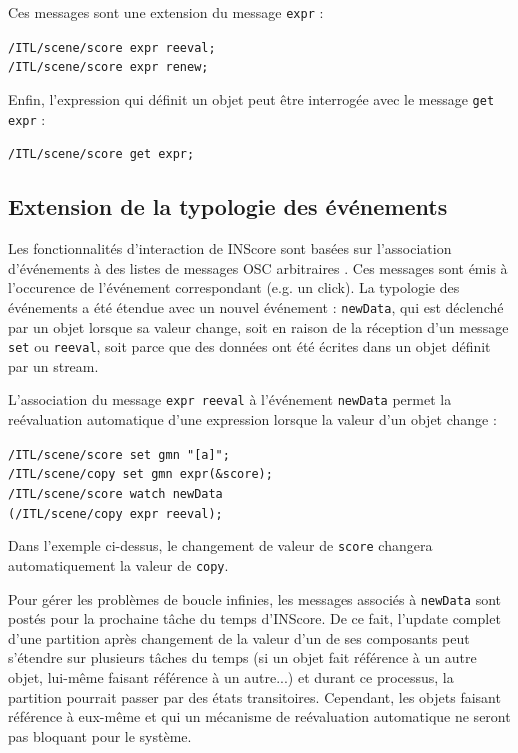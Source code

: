 \documentclass{article}
\newcommand{\OSC}[1]{\texttt{#1}}
\newcommand{\sample}	[1]			{\vspace{-0.2em}\begin{center}\colorbox{mygrey}{\begin{minipage}[t]{0.97\columnwidth} {\small \texttt{#1}}\end{minipage}}\end{center}}
\begin{document}
Ces messages sont une extension du message \OSC{expr} :
\sample{/ITL/scene/score expr reeval; \\
/ITL/scene/score expr renew;
}

Enfin, l'expression qui définit un objet peut être interrogée avec le message \OSC{get expr} :
\sample{/ITL/scene/score get expr;}

\subsection{Extension de la typologie des événements}
\label{exprEvents}

Les fonctionnalités d'interaction de INScore sont basées sur l'association d'événements à des listes de messages OSC arbitraires \cite{Fober:13b}. Ces messages sont émis à l'occurence de l'événement correspondant (e.g. un click).
La typologie des événements a été étendue avec un nouvel événement : \OSC{newData}, qui est déclenché par un objet lorsque sa valeur change, soit en raison de la réception d'un message \OSC{set} ou \OSC{reeval}, soit parce que des données ont été écrites dans un objet définit par un stream.

L'association du message \OSC{expr reeval} à l'événement \OSC{newData} permet la reévaluation automatique d'une expression lorsque la valeur d'un objet change :
\sample{/ITL/scene/score set gmn "[a]";\\
/ITL/scene/copy set gmn expr(\&score);\\
/ITL/scene/score watch newData\\   
\hspace*{8mm}(/ITL/scene/copy expr reeval);
}
Dans l'exemple ci-dessus, le changement de valeur de \OSC{score} changera automatiquement la valeur de \OSC{copy}.

Pour gérer les problèmes de boucle infinies, les messages associés à \OSC{newData} sont postés pour la prochaine tâche du temps d'INScore. De ce fait, l'update complet d'une partition après changement de la valeur d'un de ses composants peut s'étendre sur plusieurs tâches du temps (si un objet fait référence à un autre objet, lui-même faisant référence à un autre...) et durant ce processus, la partition pourrait passer par des états transitoires. Cependant, les objets faisant référence à eux-même et qui un mécanisme de reévaluation automatique ne seront pas bloquant pour le système.


\end{document}
